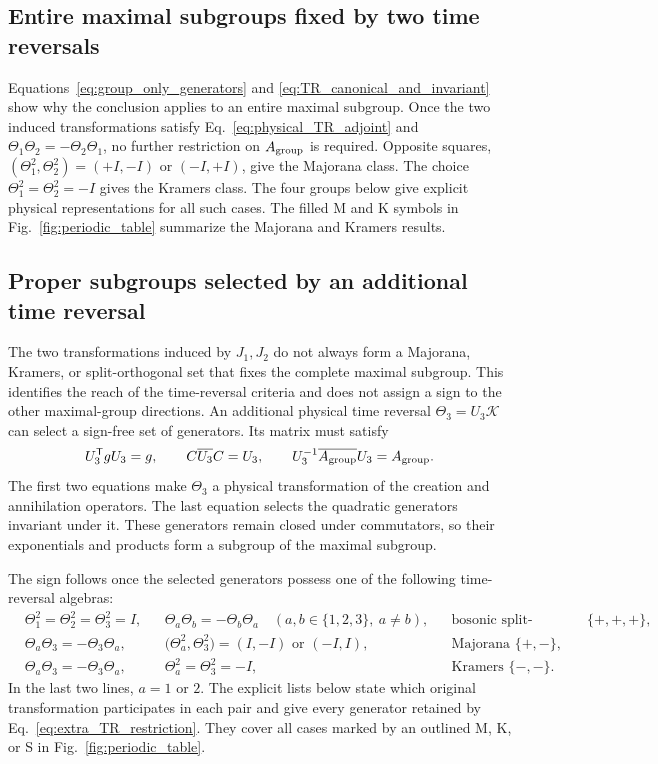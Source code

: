 \documentclass[onecolumn,aps,prb,amsmath,amssymb,superscriptaddress,longbibliography,floatfix]{revtex4-2}
\newcommand{\trans}{\mathsf{T}}
\newcommand{\mc}[1]{\mathcal{#1}}
\begin{document}
\subsection{Entire maximal subgroups fixed by two time reversals}

Equations~\eqref{eq:group_only_generators} and
\eqref{eq:TR_canonical_and_invariant} show why the conclusion applies to an
entire maximal subgroup.  Once the two induced transformations satisfy
Eq.~\eqref{eq:physical_TR_adjoint} and
\(\Theta_1\Theta_2=-\Theta_2\Theta_1\), no further restriction on
\(A_{\rm group}\) is required.  Opposite squares,
\((\Theta_1^2,\Theta_2^2)=(+I,-I)\) or \((-I,+I)\), give the Majorana
class.  The choice \(\Theta_1^2=\Theta_2^2=-I\) gives the Kramers class.
The four groups below give explicit physical representations for all such
cases.  The filled M and K symbols in Fig.~\ref{fig:periodic_table} summarize
the Majorana and Kramers results.



\subsection{Proper subgroups selected by an additional time reversal}

The two transformations induced by \(J_1,J_2\) do not always form a Majorana,
Kramers, or split-orthogonal set that fixes the complete maximal subgroup.  This
identifies the reach of the time-reversal criteria and does not assign a sign to
the other maximal-group directions.  An additional physical time reversal
\(\Theta_3=U_3\mc K\) can select a sign-free set of generators.  Its matrix must
satisfy
\begin{equation}
U_3^\trans gU_3=g,\qquad
C\overline{U_3}C=U_3,\qquad
U_3^{-1}\overline{A_{\rm group}}U_3=A_{\rm group}.
\label{eq:extra_TR_restriction}
\end{equation}
The first two equations make \(\Theta_3\) a physical transformation of the
creation and annihilation operators.  The last equation selects the quadratic
generators invariant under it.  These generators remain closed under
commutators, so their exponentials and products form a subgroup of the maximal
subgroup.

The sign follows once the selected generators possess one of the following
time-reversal algebras:
\begin{align*}
&\Theta_1^2=\Theta_2^2=\Theta_3^2=I,
&&\Theta_a\Theta_b=-\Theta_b\Theta_a
  \quad(a,b\in\{1,2,3\},\ a\ne b),
&&\text{bosonic split-orthogonal }\{+,+,+\},\\
&\Theta_a\Theta_3=-\Theta_3\Theta_a,
&&\bigl(\Theta_a^2,\Theta_3^2\bigr)=(I,-I)
   \text{ or }(-I,I),
&&\text{Majorana }\{+,-\},\\
&\Theta_a\Theta_3=-\Theta_3\Theta_a,
&&\Theta_a^2=\Theta_3^2=-I,
&&\text{Kramers }\{-,-\}.
\end{align*}
In the last two lines, \(a=1\) or \(2\).  The explicit lists below state which
original transformation participates in each pair and give every generator
retained by Eq.~\eqref{eq:extra_TR_restriction}.  They cover all cases marked by
an outlined M, K, or S in Fig.~\ref{fig:periodic_table}.
\end{document}

